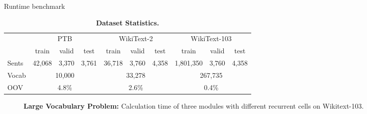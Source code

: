 \documentclass[final,t,unknownkeysallowed]{beamer}
\begin{document}
\begin{frame}{}
\begin{columns}[t]
\begin{column}{.3\linewidth}
      \begin{block}{Runtime benchmark}
      \begin{table}\small
        \caption{\textbf{Dataset Statistics.}}
        \centering
        \begin{tabular}{l|ccc|ccc|ccc}
        \toprule
        &\multicolumn{3}{c|}{PTB}&\multicolumn{3}{c|}{WikiText-2}&\multicolumn{3}{c}{WikiText-103}  \\
        &train& valid&test&train& valid&test&train & valid &test\\ \midrule
        Sents & 42,068   & 3,370  & 3,761 &36,718   & 3,760 & 4,358& 1,801,350   & 3,760 & 4,358 \\\midrule
        Vocab &\multicolumn{3}{c|}{10,000}&\multicolumn{3}{c|}{33,278} & \multicolumn{3}{c}{ 267,735}\\
        OOV &\multicolumn{3}{c|}{4.8\% }&\multicolumn{3}{c|}{2.6\% } & \multicolumn{3}{c}{0.4\%} \\
        \bottomrule
        \end{tabular}
       \end{table}
      \begin{figure}
      \caption{\textbf{Large Vocabulary Problem:} Calculation time of three modules with different recurrent cells on Wikitext-103.}
      \end{figure}
      
      \end{block}
    \end{column}



    \begin{column}{.3\linewidth}
    

\end{column}
\end{columns}
\end{frame}
\end{document}
